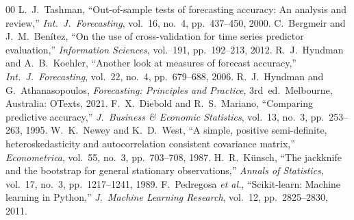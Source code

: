 \documentclass[conference]{IEEEtran}
\begin{document}
\begin{thebibliography}{00}
 L.~J.~Tashman, ``Out-of-sample tests of forecasting
accuracy: An analysis and review,'' \emph{Int.\ J.\ Forecasting}, vol.~16,
no.~4, pp.~437--450, 2000.
 C.~Bergmeir and J.~M.~Ben\'itez, ``On the use of
cross-validation for time series predictor evaluation,'' \emph{Information
Sciences}, vol.~191, pp.~192--213, 2012.
 R.~J.~Hyndman and A.~B.~Koehler, ``Another look
at measures of forecast accuracy,'' \emph{Int.\ J.\ Forecasting}, vol.~22,
no.~4, pp.~679--688, 2006.
 R.~J.~Hyndman and G.~Athanasopoulos,
\emph{Forecasting: Principles and Practice}, 3rd~ed.\ Melbourne, Australia:
OTexts, 2021.
 F.~X.~Diebold and R.~S.~Mariano, ``Comparing
predictive accuracy,'' \emph{J.\ Business \& Economic Statistics}, vol.~13,
no.~3, pp.~253--263, 1995.
 W.~K.~Newey and K.~D.~West, ``A simple, positive
semi-definite, heteroskedasticity and autocorrelation consistent covariance
matrix,'' \emph{Econometrica}, vol.~55, no.~3, pp.~703--708, 1987.
 H.~R.~K\"unsch, ``The jackknife and the bootstrap
for general stationary observations,'' \emph{Annals of Statistics}, vol.~17,
no.~3, pp.~1217--1241, 1989.
 F.~Pedregosa \emph{et al.}, ``Scikit-learn:
Machine learning in Python,'' \emph{J.\ Machine Learning Research}, vol.~12,
pp.~2825--2830, 2011.
\end{thebibliography}
\end{document}
